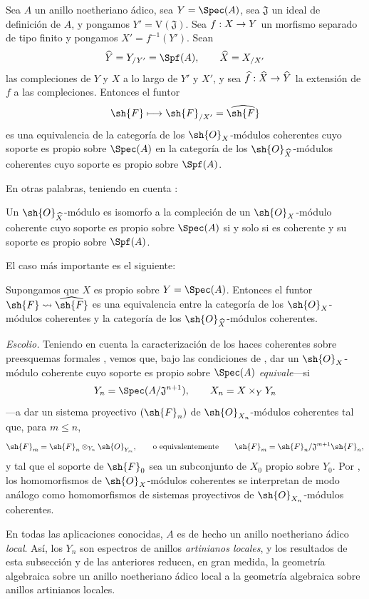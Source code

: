 \documentclass[oneside]{amsart}
\makeatletter
\renewcommand{\leq}{\leqslant}
\newcommand{\ega@arrow}[2]{\mathchoice{#1}{#2}{#2}{#2}}
\renewcommand{\to}{\ega@arrow{\longrightarrow}{\rightarrow}}
\newcommand{\oldpage}[2][]{{\marginnote{\normalfont\textbf{#1}~|~#2}}\ignorespaces}
\let\EGAOriginalLabel\label
\renewcommand{\label}[1]{\phantomsection\EGAOriginalLabel{#1}}
\makeatother
\begin{document}
\begin{theorem}[5.1.4]
\label{III.5.1.4}
Sea $A$ un anillo noetheriano ádico, sea $Y=\Spec(A)$, sea
$\mathfrak{J}$ un ideal de definición de $A$, y pongamos
$Y'=\mathrm{V}(\mathfrak{J})$. Sea $f:X\to Y$ un morfismo separado
de tipo finito y pongamos $X'=f^{-1}(Y')$. Sean
\[
  \widehat{Y}=Y_{/Y'}=\Spf(A),\qquad
  \widehat{X}=X_{/X'}
\]
las compleciones de $Y$ y $X$ a lo largo de $Y'$ y $X'$, y sea
$\widehat{f}:\widehat{X}\to\widehat{Y}$ la extensión de $f$ a
las compleciones. Entonces el funtor
\[
  \sh{F}\longmapsto\sh{F}_{/X'}=\widehat{\sh{F}}
\]
es una equivalencia de la categoría de los
$\sh{O}_X$-módulos coherentes cuyo soporte es propio sobre $\Spec(A)$ en la
categoría de los $\sh{O}_{\widehat{X}}$-módulos coherentes cuyo soporte
es propio sobre $\Spf(A)$.
\end{theorem}

En otras palabras, teniendo en cuenta :

\begin{corollary}[5.1.5]
\label{III.5.1.5}
Un $\sh{O}_{\widehat{X}}$-módulo es isomorfo a la compleción de
un $\sh{O}_X$-módulo coherente cuyo soporte es propio sobre
$\Spec(A)$ si y solo si es coherente y su soporte es propio
sobre $\Spf(A)$.
\end{corollary}

El caso más importante es el siguiente:

\begin{corollary}[5.1.6]
\label{III.5.1.6}
Supongamos que $X$ es propio sobre $Y=\Spec(A)$. Entonces el funtor
$\sh{F}\leadsto\widehat{\sh{F}}$ es una equivalencia entre la
categoría de los $\sh{O}_X$-módulos coherentes y la categoría de los
$\sh{O}_{\widehat{X}}$-módulos coherentes.
\end{corollary}

\begin{env}[5.1.7]
\label{III.5.1.7}
\emph{Escolio.}
Teniendo en cuenta la caracterización de los haces coherentes sobre
preesquemas formales , vemos que, bajo las
condiciones de , dar un
$\sh{O}_X$-módulo coherente cuyo soporte es propio sobre $\Spec(A)$
\emph{equivale}---si
\[
  Y_n=\Spec(A/\mathfrak{J}^{n+1}),\qquad
  X_n=X\times_Y Y_n
\]
---a dar un sistema proyectivo $(\sh{F}_n)$ de
$\sh{O}_{X_n}$-módulos coherentes tal que, para $m\leq n$,
\[
  \sh{F}_m
  =
  \sh{F}_n\otimes_{Y_n}\sh{O}_{Y_m},
  \qquad\text{o equivalentemente}\qquad
  \sh{F}_m
  =
  \sh{F}_n/\mathfrak{J}^{m+1}\sh{F}_n,
\]
y tal que el soporte de $\sh{F}_0$ sea un subconjunto de $X_0$
propio sobre $Y_0$. Por , los homomorfismos de
$\sh{O}_X$-módulos coherentes se interpretan de modo análogo como
homomorfismos de sistemas proyectivos de
$\sh{O}_{X_n}$-módulos coherentes.

\oldpage[III]{151}

En todas las aplicaciones conocidas, $A$ es de hecho un anillo
noetheriano ádico \emph{local}. Así, los $Y_n$ son espectros de anillos
\emph{artinianos locales}, y los resultados de esta subsección y de las
anteriores reducen, en gran medida, la geometría algebraica sobre un
anillo noetheriano ádico local a la geometría algebraica sobre anillos
artinianos locales.
\end{env}
\end{document}
